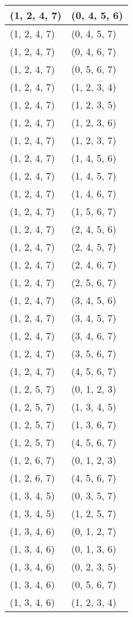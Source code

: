 \begin{footnotesize}
\begin{longtable}[c]{|l|l|}
(1, 2, 4, 7)
&(0, 4, 5, 6)
\\ \hline
(1, 2, 4, 7)
&(0, 4, 5, 7)
\\ \hline
(1, 2, 4, 7)
&(0, 4, 6, 7)
\\ \hline
(1, 2, 4, 7)
&(0, 5, 6, 7)
\\ \hline
(1, 2, 4, 7)
&(1, 2, 3, 4)
\\ \hline
(1, 2, 4, 7)
&(1, 2, 3, 5)
\\ \hline
(1, 2, 4, 7)
&(1, 2, 3, 6)
\\ \hline
(1, 2, 4, 7)
&(1, 2, 3, 7)
\\ \hline
(1, 2, 4, 7)
&(1, 4, 5, 6)
\\ \hline
(1, 2, 4, 7)
&(1, 4, 5, 7)
\\ \hline
(1, 2, 4, 7)
&(1, 4, 6, 7)
\\ \hline
(1, 2, 4, 7)
&(1, 5, 6, 7)
\\ \hline
(1, 2, 4, 7)
&(2, 4, 5, 6)
\\ \hline
(1, 2, 4, 7)
&(2, 4, 5, 7)
\\ \hline
(1, 2, 4, 7)
&(2, 4, 6, 7)
\\ \hline
(1, 2, 4, 7)
&(2, 5, 6, 7)
\\ \hline
(1, 2, 4, 7)
&(3, 4, 5, 6)
\\ \hline
(1, 2, 4, 7)
&(3, 4, 5, 7)
\\ \hline
(1, 2, 4, 7)
&(3, 4, 6, 7)
\\ \hline
(1, 2, 4, 7)
&(3, 5, 6, 7)
\\ \hline
(1, 2, 4, 7)
&(4, 5, 6, 7)
\\ \hline
(1, 2, 5, 7)
&(0, 1, 2, 3)
\\ \hline
(1, 2, 5, 7)
&(1, 3, 4, 5)
\\ \hline
(1, 2, 5, 7)
&(1, 3, 6, 7)
\\ \hline
(1, 2, 5, 7)
&(4, 5, 6, 7)
\\ \hline
(1, 2, 6, 7)
&(0, 1, 2, 3)
\\ \hline
(1, 2, 6, 7)
&(4, 5, 6, 7)
\\ \hline
(1, 3, 4, 5)
&(0, 3, 5, 7)
\\ \hline
(1, 3, 4, 5)
&(1, 2, 5, 7)
\\ \hline
(1, 3, 4, 6)
&(0, 1, 2, 7)
\\ \hline
(1, 3, 4, 6)
&(0, 1, 3, 6)
\\ \hline
(1, 3, 4, 6)
&(0, 2, 3, 5)
\\ \hline
(1, 3, 4, 6)
&(0, 5, 6, 7)
\\ \hline
(1, 3, 4, 6)
&(1, 2, 3, 4)
\\ \hline

\end{longtable}
\end{footnotesize}
